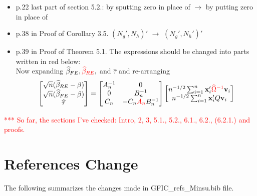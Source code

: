 \documentclass[11pt]{article}
\begin{document}
\begin{itemize}
\item p.22 last part of section 5.2.: by sputting zero in place of $\rightarrow$ by putting zero in place of
\item p.38 in Proof of Corollary 3.5. $(N_g', N_h)'$ $\rightarrow$ $(N_g', N_h')'$
\item p.39 in Proof of Theorem 5.1. The expressions should be changed into parts written in red below:\\
Now expanding $\widehat{\beta}_{FE}, \textcolor{red}{\widehat{\beta}_{RE}},$ and $\widehat{\tau}$ and re-arranging
\[\begin{bmatrix}
\sqrt{n}(\widehat{\beta}_{RE} - \beta)\\
\sqrt{n}(\widehat{\beta}_{FE}-\beta)\\
\widehat{\tau}
\end{bmatrix} =\begin{bmatrix}
A_n^{-1} & 0\\
0 & B_n^{-1} \\
C_n & -C_n \textcolor{red}{A_n}B_n^{-1}
\end{bmatrix}\begin{bmatrix}
n^{-1/2}\sum_{i=1}^n \mathbf{x}_i' \textcolor{red}{\widehat{\Omega}^{-1}} \mathbf{v}_i\\
n^{-1/2}\sum_{i=1}^n \mathbf{x}_i'Q \mathbf{v}_i
\end{bmatrix} 
\]
\end{itemize}

\newpage
\textcolor{red}{*** So far, the sections I've checked: Intro, 2, 3, 5.1., 5.2., 6.1., 6.2., (6.2.1.) and proofs.}

\section*{References Change}

The following summarizes the changes made in GFIC\_refs\_Minsu.bib file.
\end{document}
